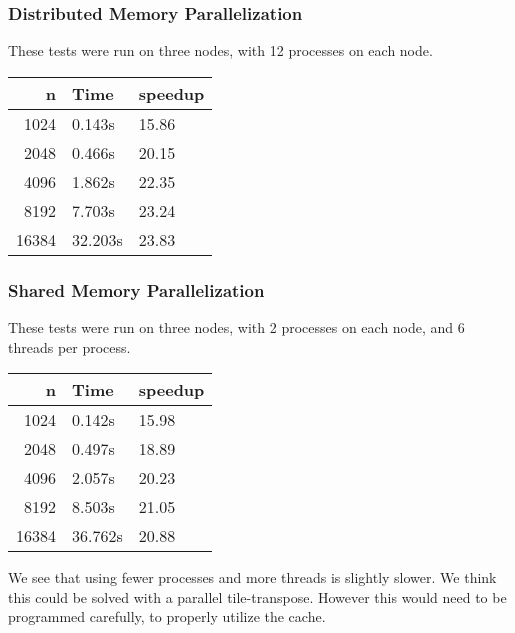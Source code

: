 \documentclass[a4paper, 12pt]{article}
\begin{document}
        \subsubsection{Distributed Memory Parallelization}
        These tests were run on three nodes, with 12 processes on each node.

        \begin{tabular}{|r|l|l|}
        \hline
        n & Time & speedup \\
        \hline
        1024 & 0.143s & 15.86 \\
        \hline
        2048 & 0.466s & 20.15 \\
        \hline
        4096 & 1.862s & 22.35 \\
        \hline
        8192 & 7.703s & 23.24\\
        \hline
        16384 & 32.203s & 23.83 \\
        \hline
        \end{tabular}
         
        \subsubsection{Shared Memory Parallelization}
        These tests were run on three nodes, with 2 processes on each node, and 6 threads per process.

        \begin{tabular}{|r|l|l|}
        \hline
        n & Time & speedup \\
        \hline
        1024 & 0.142s & 15.98 \\
        \hline
        2048 & 0.497s & 18.89 \\
        \hline
        4096 & 2.057s & 20.23 \\
        \hline
        8192 & 8.503s & 21.05\\
        \hline
        16384 & 36.762s & 20.88 \\
        \hline
        \end{tabular}
        
        We see that using fewer processes and more threads is slightly slower. We think this could be solved with a parallel tile-transpose. However this would need to be programmed carefully, to properly utilize the cache.
        
    
\end{document}

